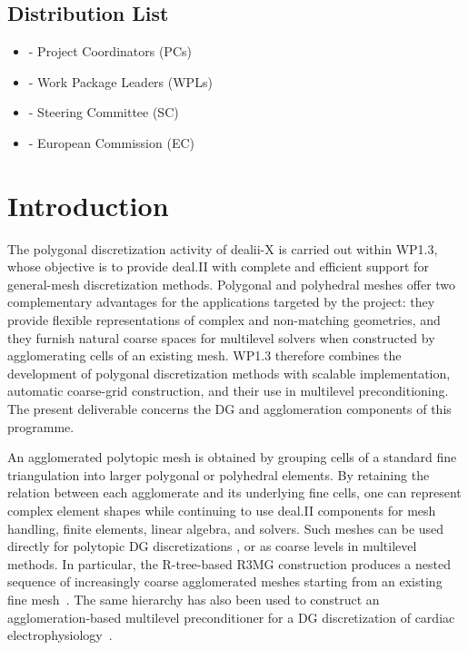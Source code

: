 \documentclass[a4paper,12pt]{article}
\begin{document}
\subsection*{{Distribution List}}
\begin{itemize}
    \item [] - Project Coordinators (PCs)
    \item [] - Work Package Leaders (WPLs)
    \item [] - Steering Committee (SC)
    \item [] - European Commission (EC)
\end{itemize}

\vspace*{2cm}

\disclaimer

\newpage

\tableofcontents

\newpage

\section{{Introduction}}
\label{sec:introduction}

The polygonal discretization activity of dealii-X is carried out within
WP1.3, whose objective is to provide deal.II with complete and efficient
support for general-mesh discretization methods. Polygonal and polyhedral
meshes offer two complementary advantages for the applications targeted by
the project: they provide flexible representations of complex and
non-matching geometries, and they furnish natural coarse spaces for multilevel
solvers when constructed by agglomerating cells of an existing mesh. WP1.3
therefore combines the development of polygonal discretization methods with
scalable implementation, automatic coarse-grid construction, and their use in
multilevel preconditioning. The present deliverable concerns the DG and
agglomeration components of this programme.

An agglomerated polytopic mesh is obtained by grouping cells of a standard
fine triangulation into larger polygonal or polyhedral elements. By retaining
the relation between each agglomerate and its underlying fine cells, one can
represent complex element shapes while continuing to use deal.II components
for mesh handling, finite elements, linear algebra, and solvers. Such meshes
can be used directly for polytopic DG discretizations
\citep{polyDG,Antoniettihp}, or as coarse levels in multilevel methods. In
particular, the R-tree-based R3MG construction produces a nested sequence of
increasingly coarse agglomerated meshes starting from an existing fine
mesh~\citep{FEDER2025113773}. The same hierarchy has also been used to construct an agglomeration-based
multilevel preconditioner for a DG discretization of cardiac
electrophysiology~\citep{FederAfrica2026}.
\end{document}
